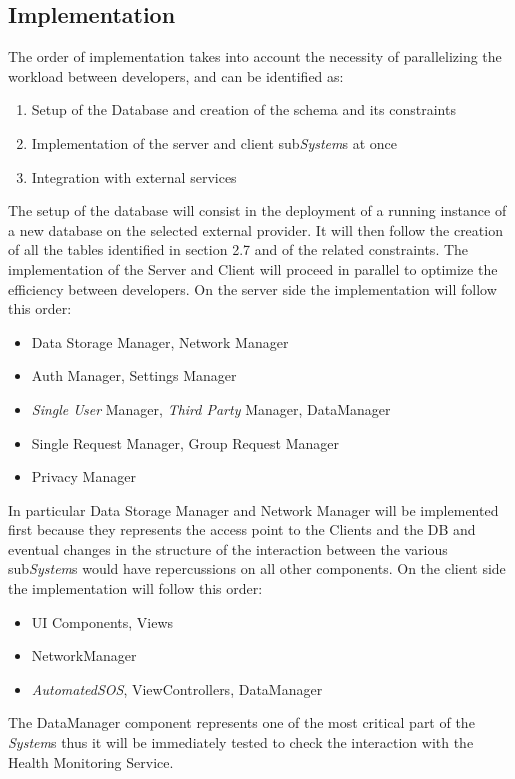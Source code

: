 \documentclass[titlepage]{article}
\begin{document}
\subsection{Implementation}
The order of implementation takes into account the necessity of parallelizing the workload between developers, and can be identified as:
\begin{enumerate}
    \item Setup of the Database and creation of the schema and its constraints
    \item Implementation of the server and client sub{\it System}s at once
    \item Integration with external services
\end{enumerate}
The setup of the database will consist in the deployment of a running instance of a new database on the selected external provider. It will then follow the creation of all the tables identified in section 2.7 and of the related constraints. \newline
\newline
The implementation of the Server and Client will proceed in parallel to optimize the efficiency between developers.
\newline
\newline
On the server side the implementation will follow this order:
\begin{itemize}
    \item Data Storage Manager, Network Manager
    \item Auth Manager, Settings Manager
    \item {\it Single User} Manager, {\it Third Party} Manager, DataManager
    \item Single Request Manager, Group Request Manager
    \item Privacy Manager
\end{itemize}
In particular Data Storage Manager and Network Manager will be implemented first because they represents the access point to the Clients and the DB and eventual changes in the structure of the interaction between the various sub{\it System}s would have repercussions on all other components.
\newline
\newline
On the client side the implementation will follow this order:
\begin{itemize}
    \item UI Components, Views
    \item NetworkManager
    \item {\it AutomatedSOS}, ViewControllers, DataManager
\end{itemize}
The DataManager component represents one of the most critical part of the {\it System}s thus it will be immediately tested to check the interaction with the Health Monitoring Service.
\end{document}
